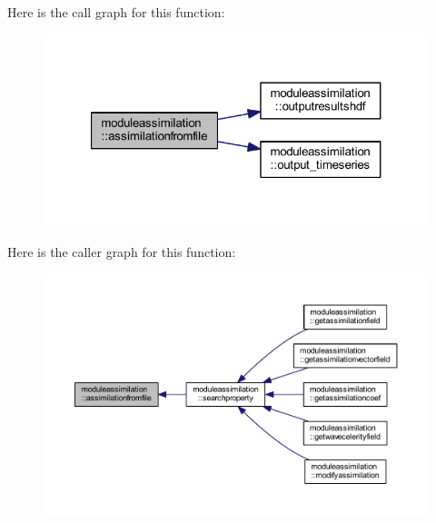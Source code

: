 Here is the call graph for this function\+:\nopagebreak
\begin{figure}[H]
\begin{center}
\leavevmode
\includegraphics[width=321pt]{namespacemoduleassimilation_ac07092b01bbf318f77800bb88c9f12bf_cgraph}
\end{center}
\end{figure}
Here is the caller graph for this function\+:\nopagebreak
\begin{figure}[H]
\begin{center}
\leavevmode
\includegraphics[width=350pt]{namespacemoduleassimilation_ac07092b01bbf318f77800bb88c9f12bf_icgraph}
\end{center}
\end{figure}
\mbox{\label{namespacemoduleassimilation_a689487c17f9fdb64311b351530c9244a}} 
